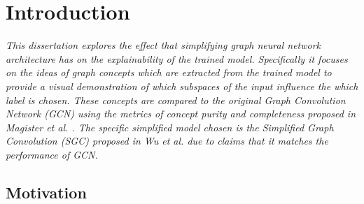 \chapter{Introduction}


\emph{
This dissertation explores the effect that simplifying graph neural network architecture has on the explainability of the trained model.
Specifically it focuses on the ideas of graph concepts which are extracted from the trained model to provide a visual demonstration of which subspaces of the input influence the which label is chosen.
These concepts are compared to the original Graph Convolution Network (GCN) using the metrics of concept purity and completeness proposed in \textit{Magister et al.} \cite{magister2021gcexplainer}.
The specific simplified model chosen is the Simplified Graph Convolution (SGC) proposed in \textit{Wu et al.} \cite{wu2019simplifying} due to claims that it matches the performance of GCN.
}

\section{Motivation}
\label{sec:motivation}




